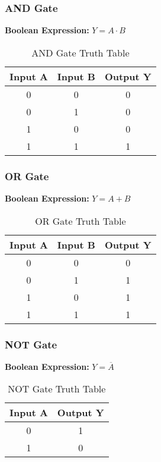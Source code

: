 \documentclass[11pt]{article}
\begin{document}
\subsubsection{AND Gate}
\textbf{Boolean Expression:} $Y = A \cdot B$
\begin{table}[htbp]
    \centering
    \caption{AND Gate Truth Table}
    \begin{tabular}{cc c}
        \toprule
        \textbf{Input A} & \textbf{Input B} & \textbf{Output Y} \\ \midrule
        0 & 0 & 0 \\
        0 & 1 & 0 \\
        1 & 0 & 0 \\
        1 & 1 & 1 \\ \bottomrule
    \end{tabular}
\end{table}

\subsubsection{OR Gate}
\textbf{Boolean Expression:} $Y = A + B$
\begin{table}[htbp]
    \centering
    \caption{OR Gate Truth Table}
    \begin{tabular}{cc c}
        \toprule
        \textbf{Input A} & \textbf{Input B} & \textbf{Output Y} \\ \midrule
        0 & 0 & 0 \\
        0 & 1 & 1 \\
        1 & 0 & 1 \\
        1 & 1 & 1 \\ \bottomrule
    \end{tabular}
\end{table}

\subsubsection{NOT Gate}
\textbf{Boolean Expression:} $Y = \overline{A}$
\begin{table}[htbp]
    \centering
    \caption{NOT Gate Truth Table}
    \begin{tabular}{c c}
        \toprule
        \textbf{Input A} & \textbf{Output Y} \\ \midrule
        0 & 1 \\
        1 & 0 \\ \bottomrule
    \end{tabular}
\end{table}
\end{document}
